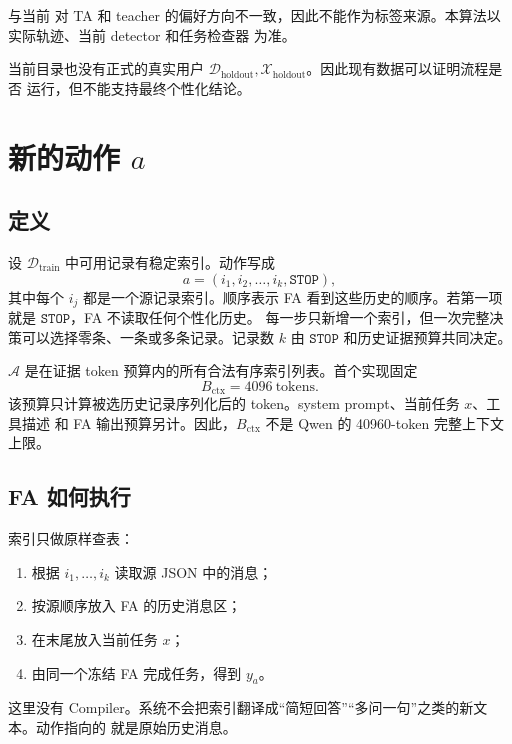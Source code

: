 \documentclass[11pt,UTF8,fontset=none]{ctexart}
\newcommand{\Dtrain}{\mathcal D_{\mathrm{train}}}
\newcommand{\Dholdout}{\mathcal D_{\mathrm{holdout}}}
\newcommand{\Xholdout}{\mathcal X_{\mathrm{holdout}}}
\begin{document}
 与当前  对 TA 和
teacher 的偏好方向不一致，因此不能作为标签来源。本算法以实际轨迹、当前 detector 和任务检查器
为准。

当前目录也没有正式的真实用户 \(\Dholdout,\Xholdout\)。因此现有数据可以证明流程是否
运行，但不能支持最终个性化结论。

\section[新的动作 a]{新的动作 \(a\)}

\subsection{定义}

设 \(\Dtrain\) 中可用记录有稳定索引。动作写成
\begin{equation}
  a=(i_1,i_2,\ldots,i_k,\mathtt{STOP}),
  \label{eq:action}
\end{equation}
其中每个 \(i_j\) 都是一个源记录索引。顺序表示 FA 看到这些历史的顺序。若第一项就是
\(\mathtt{STOP}\)，FA 不读取任何个性化历史。
每一步只新增一个索引，但一次完整决策可以选择零条、一条或多条记录。记录数 \(k\) 由
\(\mathtt{STOP}\) 和历史证据预算共同决定。

\(\mathcal A\) 是在证据 token 预算内的所有合法有序索引列表。首个实现固定
\begin{equation}
  B_{\mathrm{ctx}}=4096\ \text{tokens}.
  \label{eq:context-budget}
\end{equation}
该预算只计算被选历史记录序列化后的 token。system prompt、当前任务 \(x\)、工具描述
和 FA 输出预算另计。因此，\(B_{\mathrm{ctx}}\) 不是 Qwen 的 40960-token 完整上下文
上限。

\subsection{FA 如何执行}

索引只做原样查表：
\begin{enumerate}
  \item 根据 \(i_1,\ldots,i_k\) 读取源 JSON 中的消息；
  \item 按源顺序放入 FA 的历史消息区；
  \item 在末尾放入当前任务 \(x\)；
  \item 由同一个冻结 FA 完成任务，得到 \(y_a\)。
\end{enumerate}

这里没有 Compiler。系统不会把索引翻译成“简短回答”“多问一句”之类的新文本。动作指向的
就是原始历史消息。
\end{document}
